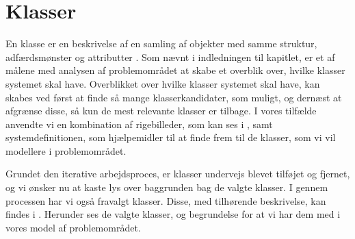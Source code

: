 \section{Klasser}
\label{sec:klasser}

En klasse er en beskrivelse af en samling af objekter med samme struktur, adfærdsmønster og attributter \cite[s. ~51]{ooad}. Som nævnt i indledningen til kapitlet, er et af målene med analysen af problemområdet at skabe et overblik over, hvilke klasser systemet skal have. Overblikket over hvilke klasser systemet skal have, kan skabes ved først at finde så mange klasserkandidater, som muligt, og dernæst at afgrænse disse, så kun de mest relevante klasser er tilbage. I vores tilfælde anvendte vi en kombination af rigebilleder, som kan ses i , samt systemdefinitionen, som hjælpemidler til at finde frem til de klasser, som vi vil modellere i problemområdet.

Grundet den iterative arbejdsproces, er klasser undervejs blevet tilføjet og fjernet, og vi ønsker nu at kaste lys over baggrunden bag de valgte klasser. I gennem processen har vi også fravalgt klasser. Disse, med tilhørende beskrivelse, kan findes i . Herunder ses de valgte klasser, og begrundelse for at vi har dem med i vores model af problemområdet.

